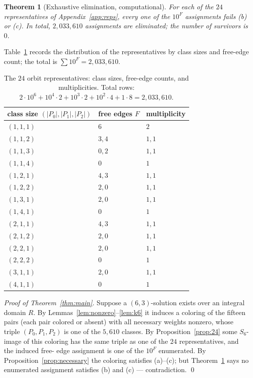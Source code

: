 \documentclass[11pt]{article}
\newtheorem{theorem}{Theorem}
\theoremstyle{definition}
\begin{document}
\begin{theorem}[Exhaustive elimination, computational]\label{thm:search}
For each of the $24$ representatives of Appendix~\ref{app:reps},
every one of the $10^{F}$ assignments fails (b) or (c). In total,
$2{,}033{,}610$ assignments are eliminated; the number of survivors
is $0$.
\end{theorem}

Table~\ref{tab:classes} records the distribution of the
representatives by class sizes and free-edge count; the total is
$\sum 10^{F}=2{,}033{,}610$.

\begin{table}[h]
\centering
\begin{tabular}{lll}
\toprule
class size $(|P_0|,|P_1|,|P_2|)$ & free edges $F$ & multiplicity \\
\midrule
$(1,1,1)$ & $6$ & $2$ \\
$(1,1,2)$ & $3,4$ & $1,1$ \\
$(1,1,3)$ & $0,2$ & $1,1$ \\
$(1,1,4)$ & $0$ & $1$ \\
$(1,2,1)$ & $4,3$ & $1,1$ \\
$(1,2,2)$ & $2,0$ & $1,1$ \\
$(1,3,1)$ & $2,0$ & $1,1$ \\
$(1,4,1)$ & $0$ & $1$ \\
$(2,1,1)$ & $4,3$ & $1,1$ \\
$(2,1,2)$ & $2,0$ & $1,1$ \\
$(2,2,1)$ & $2,0$ & $1,1$ \\
$(2,2,2)$ & $0$ & $1$ \\
$(3,1,1)$ & $2,0$ & $1,1$ \\
$(4,1,1)$ & $0$ & $1$ \\
\bottomrule
\end{tabular}
\caption{The $24$ orbit representatives: class sizes, free-edge counts,
and multiplicities. Total rows: $2\cdot 10^{6}+10^{4}\cdot 2+
10^{3}\cdot 2+10^{2}\cdot 4+1\cdot 8=2{,}033{,}610$.}
\label{tab:classes}
\end{table}

\emph{Proof of Theorem~\ref{thm:main}.} Suppose a $(6,3)$-solution
exists over an integral domain $R$. By
Lemmas~\ref{lem:nonzero}--\ref{lem:k6} it induces a coloring of the
fifteen pairs (each pair colored or absent) with all necessary weights
nonzero, whose triple $(P_0,P_1,P_2)$ is one of the $5{,}610$ classes.
By Proposition~\ref{prop:24} some $S_6$-image of this coloring has the
same triple as one of the $24$ representatives, and the induced free-
edge assignment is one of the $10^{F}$ enumerated. By
Proposition~\ref{prop:necessary} the coloring satisfies (a)--(c); but
Theorem~\ref{thm:search} says no enumerated assignment satisfies (b)
and (c) --- contradiction. \qed
\end{document}
